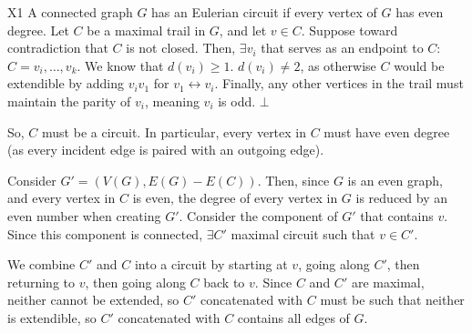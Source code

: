 \documentclass[8pt]{extarticle}
\begin{document}
  \begin{problem}{X1}
    A connected graph $G$ has an Eulerian circuit if every vertex of $G$ has even degree.
    \tcblower
    Let $C$ be a maximal trail in $G$, and let $v\in C$. Suppose toward contradiction that $C$ is not closed. Then, $\exists v_i$ that serves as an endpoint to $C$: $C = v_i,\dots,v_k$. We know that $d(v_i) \geq 1$. $d(v_i) \neq 2$, as otherwise $C$ would be extendible by adding $v_iv_1$ for $v_1\leftrightarrow v_i$. Finally, any other vertices in the trail must maintain the parity of $v_i$, meaning $v_i$ is odd. $\bot$

    So, $C$ must be a circuit. In particular, every vertex in $C$ must have even degree (as every incident edge is paired with an outgoing edge).\newline

    Consider $G' = (V(G),E(G) - E(C))$. Then, since $G$ is an even graph, and every vertex in $C$ is even, the degree of every vertex in $G$ is reduced by an even number when creating $G'$. Consider the component of $G'$ that contains $v$. Since this component is connected, $\exists C'$ maximal circuit such that $v\in C'$. \newline

    We combine $C'$ and $C$ into a circuit by starting at $v$, going along $C'$, then returning to $v$, then going along $C$ back to $v$. Since $C$ and $C'$ are maximal, neither cannot be extended, so $C'$ concatenated with $C$ must be such that neither is extendible, so $C'$ concatenated with $C$ contains all edges of $G$.
  \end{problem}
\end{document}
